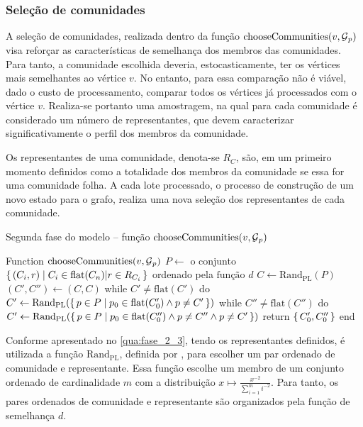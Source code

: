 \documentclass[notes.tex]{subfiles}
\begin{document}
\subsubsection{Seleção de comunidades}

A seleção de comunidades, realizada dentro da função $\text{chooseCommunities}(v, \operatorname{\mathcal{G}}_p)$ visa reforçar as características de semelhança dos membros das comunidades.
Para tanto, a comunidade escolhida deveria, estocasticamente, ter os vértices mais semelhantes ao vértice $v$.
No entanto, para essa comparação não é viável, dado o custo de processamento, comparar todos os vértices já processados com o vértice $v$.
Realiza-se portanto uma amostragem, na qual para cada comunidade é considerado um número de representantes, que devem caracterizar significativamente o perfil dos membros da comunidade.

Os representantes de uma comunidade, denota-se $R_C$, são, em um primeiro momento definidos como a totalidade dos membros da comunidade se essa for uma comunidade folha.
A cada lote processado, o processo de construção de um novo estado para o grafo, realiza uma nova seleção dos representantes de cada comunidade.

\begin{quadro}[htbp]
\caption{Segunda fase do modelo -- função $\text{chooseCommunities}(v, \operatorname{\mathcal{G}}_p)$}
\label{qua:fase_2_3}
\begin{algorithm}
Function $\text{chooseCommunities}(v, \operatorname{\mathcal{G}}_p)$
    $P \leftarrow $ o conjunto $\set{(C_i, r) | C_i \in \text{flat}(C_n) | r \in R_{C_i}}$ ordenado pela  $\text{função } d$
    $C \leftarrow \text{Rand}_{\text{PL}}(P)$
    $(C', C'') \leftarrow (C, C)$
    while $C' \neq \text{flat}(C')$ do $C' \leftarrow \text{Rand}_\text{PL}(\set{p \in P | p_0 \in \text{flat}(C'_0) \land p \neq C'})$
    while $C'' \neq \text{flat}(C'')$ do $C' \leftarrow \text{Rand}_\text{PL}(\set{p \in P | p_0 \in \text{flat}(C''_0) \land p \neq C'' \land p \neq C'})$
    return $\set{C'_0, C''_0}$
end
\end{algorithm}
\end{quadro}

Conforme apresentado no \autoref{qua:fase_2_3}, tendo os representantes definidos, é utilizada a função $\text{Rand}_\text{PL}$, definida por , para escolher um par ordenado de comunidade e representante.
Essa função escolhe um membro de um conjunto ordenado de cardinalidade $m$ com a distribuição $x \mapsto \frac{x^{-2}}{\sum^m_{i=1}i^{-2}}$.
Para tanto, os pares ordenados de comunidade e representante são organizados pela função de semelhança $d$.
\end{document}
